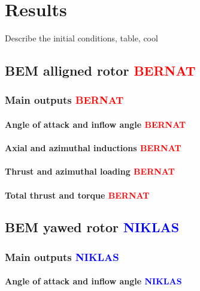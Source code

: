 \chapter{Results}


Describe the initial conditions, table, cool


\section{BEM alligned rotor \textcolor{red}{BERNAT}}


\subsection{Main outputs \textcolor{red}{BERNAT}}


\subsubsection{Angle of attack and inflow angle \textcolor{red}{BERNAT}}

\subsubsection{Axial and azimuthal inductions \textcolor{red}{BERNAT}}

\subsubsection{Thrust and azimuthal loading \textcolor{red}{BERNAT}}

\subsubsection{Total thrust and torque \textcolor{red}{BERNAT}}


\section{BEM yawed rotor \textcolor{blue}{NIKLAS}}


\subsection{Main outputs \textcolor{blue}{NIKLAS}}


\subsubsection{Angle of attack and inflow angle \textcolor{blue}{NIKLAS}}

